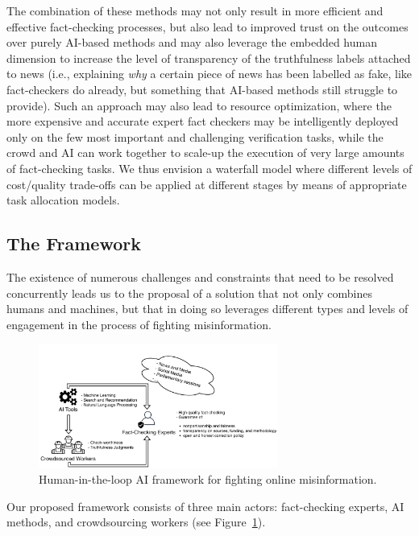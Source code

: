 \documentclass[11pt]{article}
\begin{document}
The combination of these methods may not only result in more efficient and effective fact-checking processes, but also lead to improved trust on the outcomes over purely AI-based methods and may also leverage the embedded human dimension to increase the level of transparency of the truthfulness labels attached to news (i.e., explaining \textit{why} a certain piece of news has been labelled as fake, like fact-checkers do already, but something that AI-based methods still struggle to provide).
% 
Such an approach may also lead to resource optimization, where the more expensive and accurate expert fact checkers may be intelligently deployed only on the few most important and challenging verification tasks, while the crowd and AI can work together to scale-up the execution of very large amounts of fact-checking tasks.
% 
We thus envision a waterfall model where different levels of cost/quality trade-offs can be applied at different stages by means of appropriate task allocation models. 



\subsection{The Framework}
\label{sec:crowdAIexperts}

The existence of numerous challenges and constraints that need to be resolved concurrently leads us to the proposal of a solution that not only combines humans and machines, but that in doing so leverages different types and levels of engagement in the process of fighting misinformation.
% 
\begin{figure}[tb]
    \centering
    \includegraphics[width=0.7\textwidth,bb=0 0 977 506]{submissions/gianluca/figs/framework.pdf}
    \caption{Human-in-the-loop AI framework for fighting online misinformation.}
    \label{fig:framework}
\end{figure}
% 
Our proposed framework consists of three main actors: fact-checking experts, AI methods, and crowdsourcing workers (see Figure~\ref{fig:framework}). 
\end{document}
